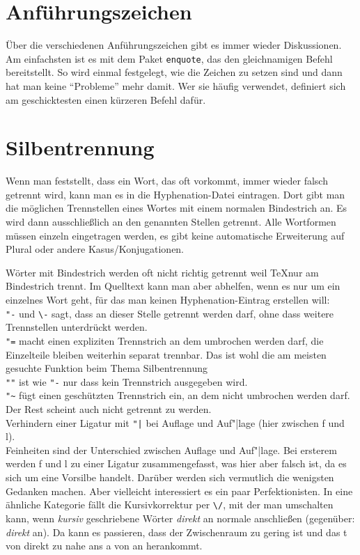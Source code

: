 \section{Anführungszeichen}

Über die verschiedenen Anführungszeichen gibt es immer wieder Diskussionen. Am einfachsten ist es mit dem Paket \texttt{enquote}, das den gleichnamigen Befehl bereitstellt. So wird einmal festgelegt, wie die Zeichen zu setzen sind und dann hat man keine \enquote{Probleme} mehr damit. Wer sie häufig verwendet, definiert sich am geschicktesten einen kürzeren Befehl dafür.

\section{Silbentrennung}
Wenn man feststellt, dass ein Wort, das oft vorkommt, immer wieder falsch getrennt wird, kann man es in die Hyphenation-Datei eintragen. Dort gibt man die möglichen Trennstellen eines Wortes mit einem normalen Bindestrich an. Es wird dann ausschließlich an den genannten Stellen getrennt. Alle Wortformen müssen einzeln eingetragen werden, es gibt keine automatische Erweiterung auf Plural oder andere Kasus/Konjugationen.

Wörter mit Bindestrich werden oft nicht richtig getrennt weil \TeX nur am Bindestrich trennt. Im Quelltext kann man aber abhelfen, wenn es nur um ein einzelnes Wort geht, für das man keinen Hyphenation-Eintrag erstellen will:\\
\verb+"-+ und \verb+\-+ sagt, dass an dieser Stelle getrennt werden darf, ohne dass weitere Trennstellen unterdrückt werden.\\
\verb+"=+ macht einen expliziten Trennstrich an dem umbrochen werden darf, die Einzelteile bleiben weiterhin separat trennbar. Das ist wohl die am meisten gesuchte Funktion beim Thema Silbentrennung\\
\verb+""+ ist wie \verb+"-+ nur dass kein Trennstrich ausgegeben wird.\\
\verb+"~+ fügt einen geschützten Trennstrich ein, an dem nicht umbrochen werden darf. Der Rest scheint auch nicht getrennt zu werden.\\
Verhindern einer Ligatur mit \verb+"|+ bei Auflage und Auf"|lage (hier zwischen f und l).\\

Feinheiten sind der Unterschied zwischen Auflage und Auf"|lage. Bei ersterem werden f und l zu einer Ligatur zusammengefasst, was hier aber falsch ist, da es sich um eine Vorsilbe handelt. Darüber werden sich vermutlich die wenigsten Gedanken machen. Aber vielleicht interessiert es ein paar Perfektionisten. In eine ähnliche Kategorie fällt die Kursivkorrektur per \verb+\/+, mit der man umschalten kann, wenn \emph{kursiv\/} geschriebene Wörter \emph{direkt\/} an normale anschließen (gegenüber: \emph{direkt} an). Da kann es passieren, dass der Zwischenraum zu gering ist und das t von direkt zu nahe ans a von an herankommt.


